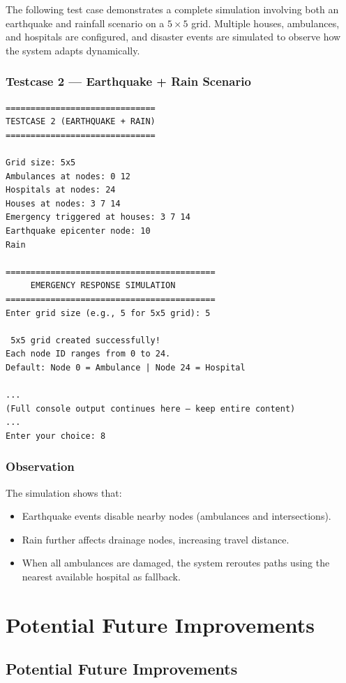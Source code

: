\documentclass[12pt,a4paper]{report}
\begin{document}
The following test case demonstrates a complete simulation involving both an earthquake and rainfall scenario on a $5 \times 5$ grid. 
Multiple houses, ambulances, and hospitals are configured, and disaster events are simulated to observe how the system adapts dynamically.

\subsection*{Testcase 2 — Earthquake + Rain Scenario}

\begin{lstlisting}[style=cpp]
==============================
TESTCASE 2 (EARTHQUAKE + RAIN)
==============================

Grid size: 5x5
Ambulances at nodes: 0 12
Hospitals at nodes: 24
Houses at nodes: 3 7 14
Emergency triggered at houses: 3 7 14
Earthquake epicenter node: 10
Rain

==========================================
     EMERGENCY RESPONSE SIMULATION
==========================================
Enter grid size (e.g., 5 for 5x5 grid): 5

 5x5 grid created successfully!
Each node ID ranges from 0 to 24.
Default: Node 0 = Ambulance | Node 24 = Hospital

...
(Full console output continues here — keep entire content)
...
Enter your choice: 8
\end{lstlisting}

\subsection*{Observation}
The simulation shows that:
\begin{itemize}
    \item Earthquake events disable nearby nodes (ambulances and intersections).
    \item Rain further affects drainage nodes, increasing travel distance.
    \item When all ambulances are damaged, the system reroutes paths using the nearest available hospital as fallback.
\end{itemize}

\chapter{Potential Future Improvements}
\section{Potential Future Improvements}
\end{document}
